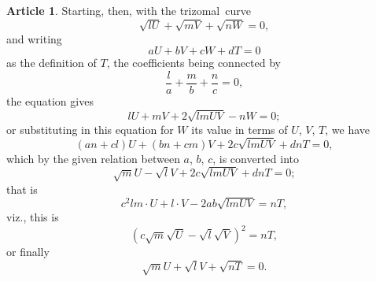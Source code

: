 \documentclass[11pt,a4paper]{article}
\theoremstyle{definition}
\newtheorem{art}{Article}
\newcommand{\trizomal}{trizomal}
\begin{document}
\begin{art}
Starting, then, with the \trizomal\ curve
\[
\sqrt{lU} + \sqrt{mV} + \sqrt{nW} = 0,
\]
and writing
\[
aU + bV + cW + dT = 0
\]
as the definition of $T$, the coefficients being connected by
\[
\frac{l}{a} + \frac{m}{b} + \frac{n}{c} = 0,
\]
the equation gives
\[
lU + mV + 2\sqrt{lmUV} - nW = 0;
\]
or substituting in this equation for $W$ its value in terms of $U$, $V$, $T$, we have
\[
(an + cl)U + (bn + cm)V + 2c\sqrt{lmUV} + dnT = 0,
\]
which by the given relation between $a$, $b$, $c$, is converted into
\[
\sqrt{m}U - \sqrt{l}V + 2c\sqrt{lmUV} + dnT = 0;
\]
that is
\[
c^{2}lm \cdot U + l \cdot V - 2ab\sqrt{lmUV} = nT,
\]
viz., this is
\[
\left(c\sqrt{m}\sqrt{U} - \sqrt{l}\sqrt{V}\right)^{2} = nT,
\]
or finally
\[
\sqrt{m}U + \sqrt{l}V + \sqrt{nT} = 0.
\]
\end{art}
\end{document}

